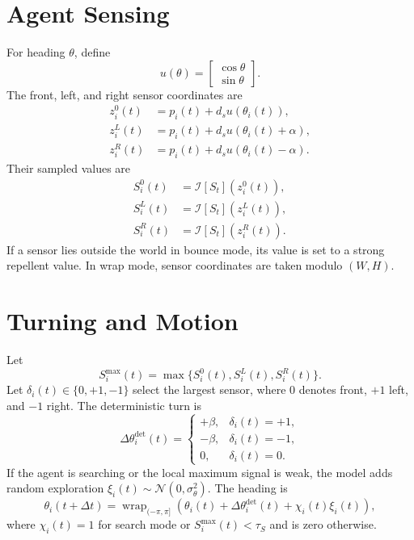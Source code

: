 \documentclass[11pt]{article}
\begin{document}
\section{Agent Sensing}
For heading $\theta$, define
\begin{equation}
  u(\theta)=
  \begin{bmatrix}
  \cos\theta\\
  \sin\theta
  \end{bmatrix}.
\end{equation}
The front, left, and right sensor coordinates are
\begin{align}
  z_i^0(t)&=p_i(t)+d_su(\theta_i(t)),\\
  z_i^L(t)&=p_i(t)+d_su(\theta_i(t)+\alpha),\\
  z_i^R(t)&=p_i(t)+d_su(\theta_i(t)-\alpha).
\end{align}
Their sampled values are
\begin{align}
  S_i^0(t)&=\mathcal{I}[S_t](z_i^0(t)),\\
  S_i^L(t)&=\mathcal{I}[S_t](z_i^L(t)),\\
  S_i^R(t)&=\mathcal{I}[S_t](z_i^R(t)).
\end{align}
If a sensor lies outside the world in bounce mode, its value is set to a strong
repellent value. In wrap mode, sensor coordinates are taken modulo $(W,H)$.

\section{Turning and Motion}
Let
\begin{equation}
  S_i^{\max}(t)=\max\{S_i^0(t),S_i^L(t),S_i^R(t)\}.
\end{equation}
Let $\delta_i(t)\in\{0,+1,-1\}$ select the largest sensor, where $0$ denotes
front, $+1$ left, and $-1$ right. The deterministic turn is
\begin{equation}
  \Delta\theta_i^{\mathrm{det}}(t)=
  \begin{cases}
  +\beta, & \delta_i(t)=+1,\\
  -\beta, & \delta_i(t)=-1,\\
  0, & \delta_i(t)=0.
  \end{cases}
\end{equation}
If the agent is searching or the local maximum signal is weak, the model adds
random exploration $\xi_i(t)\sim\mathcal{N}(0,\sigma_\theta^2)$. The heading is
\begin{equation}
  \theta_i(t+\Delta t)=
  \operatorname{wrap}_{(-\pi,\pi]}
  \left(\theta_i(t)+\Delta\theta_i^{\mathrm{det}}(t)+\chi_i(t)\xi_i(t)\right),
\end{equation}
where $\chi_i(t)=1$ for search mode or $S_i^{\max}(t)<\tau_S$ and is zero
otherwise.
\end{document}

